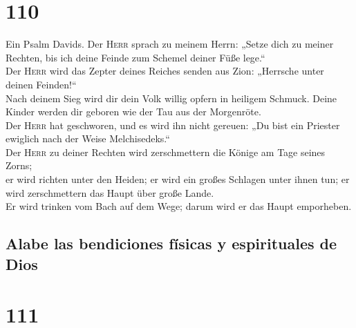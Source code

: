 \hypertarget{section-109}{%
\section{110}\label{section-109}}

 Ein Psalm Davids. Der \textsc{Herr} sprach zu meinem
Herrn: „Setze dich zu meiner Rechten, bis ich deine Feinde zum Schemel
deiner Füße lege.``\\
 Der \textsc{Herr} wird das Zepter deines Reiches senden
aus Zion: „Herrsche unter deinen Feinden!{}``\\
 Nach deinem Sieg wird dir dein Volk willig opfern in
heiligem Schmuck. Deine Kinder werden dir geboren wie der Tau aus der
Morgenröte.\\
 Der \textsc{Herr} hat geschworen, und es wird ihn nicht
gereuen: „Du bist ein Priester ewiglich nach der Weise Melchisedeks.``\\
 Der \textsc{Herr} zu deiner Rechten wird zerschmettern
die Könige am Tage seines Zorns;\\
 er wird richten unter den Heiden; er wird ein großes
Schlagen unter ihnen tun; er wird zerschmettern das Haupt über große
Lande.\\
 Er wird trinken vom Bach auf dem Wege; darum wird er das
Haupt emporheben.

\hypertarget{alabe-las-bendiciones-fuxedsicas-y-espirituales-de-dios}{%
\subsection{Alabe las bendiciones físicas y espirituales de
Dios}\label{alabe-las-bendiciones-fuxedsicas-y-espirituales-de-dios}}

\hypertarget{section-110}{%
\section{111}\label{section-110}}

